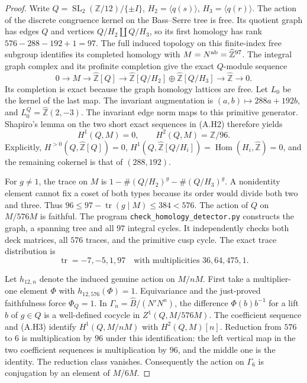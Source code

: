 \begin{proof}
Write $Q=\operatorname{SL}_2(\mathbb Z/12)/\{\pm I\}$,
$H_2=\langle q(s)\rangle$, $H_3=\langle q(r)\rangle$.
The action of the discrete congruence kernel on the Bass--Serre
tree is free. Its quotient graph has edges $Q$ and vertices
$Q/H_2\amalg Q/H_3$, so its first homology has rank
$576-288-192+1=97$. The full induced topology on this
finite-index free subgroup identifies its completed homology with
$M=N^{\rm ab}=\widehat{\mathbb Z}^{97}$. The integral graph
complex and its profinite completion give the exact $Q$-module
sequence
\[
 0\to M\to \widehat{\mathbb Z}[Q]
 \to \widehat{\mathbb Z}[Q/H_2]\oplus
       \widehat{\mathbb Z}[Q/H_3]
 \to\widehat{\mathbb Z}\to0.                              \tag{A.H2}
\]
Its completion is exact because the graph homology lattices are
free. Let $L_0$ be the kernel of the last map. The invariant
augmentation is $(a,b)\mapsto288a+192b$, and
$L_0^Q=\widehat{\mathbb Z}(2,-3)$. The invariant edge norm
maps to this primitive generator. Shapiro's lemma on the two
short exact sequences in (A.H2) therefore yields
\[
 H^1(Q,M)=0,\qquad H^2(Q,M)=\mathbb Z/96.                  \tag{A.H3}
\]
Explicitly, $H^{>0}(Q,\widehat{\mathbb Z}[Q])=0$,
$H^1(Q,\widehat{\mathbb Z}[Q/H_i])=
\operatorname{Hom}(H_i,\widehat{\mathbb Z})=0$, and the
remaining cokernel is that of $(288,192)$.

For $g\ne1$, the trace on $M$ is
$1-\#(Q/H_2)^g-\#(Q/H_3)^g$. A nonidentity element cannot
fix a coset of both types because its order would divide both
two and three. Thus
$96\le97-\operatorname{tr}(g\mid M)\le384<576$.
The action of $Q$ on $M/576M$ is faithful. The program
\texttt{check\_homology\_detector.py} constructs the graph,
a spanning tree and all $97$ integral cycles. It independently
checks both deck matrices, all $576$ traces, and the primitive
cusp cycle. The exact trace distribution is
\[
 \operatorname{tr}=-7,-5,1,97
 \quad\text{with multiplicities }36,64,475,1.             \tag{A.H4}
\]

Let $h_{12,n}$ denote the induced genuine action on $M/nM$.
First take a multiplier-one element $\Phi$ with
$h_{12,576}(\Phi)=1$. Equivariance and the just-proved
faithfulness force $\Phi_Q=1$. In
$\Gamma_n=\widehat B/(N'N^n)$, the difference
$\Phi(b)b^{-1}$ for a lift $b$ of $g\in Q$ is a well-defined
cocycle in $Z^1(Q,M/576M)$. The coefficient sequence and
(A.H3) identify $H^1(Q,M/nM)$ with $H^2(Q,M)[n]$.
Reduction from $576$ to $6$ is multiplication by $96$ under
this identification: the left vertical map in the two
coefficient sequences is multiplication by $96$, and the
middle one is the identity. The reduction class vanishes.
Consequently the action on $\Gamma_6$ is conjugation by an
element of $M/6M$.


\end{proof}
